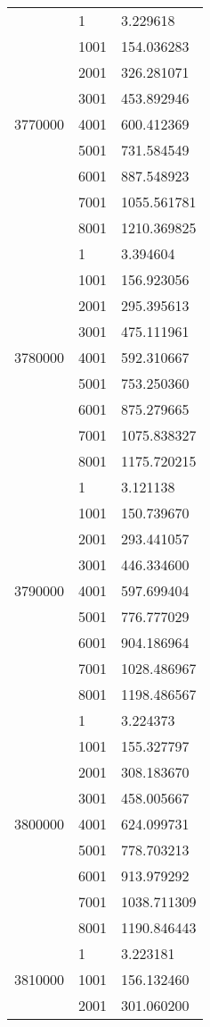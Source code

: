 \begin{table}[htb!]
\begin{tabular}{lll}
\multirow[c]{9}{*}{3770000} & 1 & 3.229618 \\
 & 1001 & 154.036283 \\
 & 2001 & 326.281071 \\
 & 3001 & 453.892946 \\
 & 4001 & 600.412369 \\
 & 5001 & 731.584549 \\
 & 6001 & 887.548923 \\
 & 7001 & 1055.561781 \\
 & 8001 & 1210.369825 \\
\multirow[c]{9}{*}{3780000} & 1 & 3.394604 \\
 & 1001 & 156.923056 \\
 & 2001 & 295.395613 \\
 & 3001 & 475.111961 \\
 & 4001 & 592.310667 \\
 & 5001 & 753.250360 \\
 & 6001 & 875.279665 \\
 & 7001 & 1075.838327 \\
 & 8001 & 1175.720215 \\
\multirow[c]{9}{*}{3790000} & 1 & 3.121138 \\
 & 1001 & 150.739670 \\
 & 2001 & 293.441057 \\
 & 3001 & 446.334600 \\
 & 4001 & 597.699404 \\
 & 5001 & 776.777029 \\
 & 6001 & 904.186964 \\
 & 7001 & 1028.486967 \\
 & 8001 & 1198.486567 \\
\multirow[c]{9}{*}{3800000} & 1 & 3.224373 \\
 & 1001 & 155.327797 \\
 & 2001 & 308.183670 \\
 & 3001 & 458.005667 \\
 & 4001 & 624.099731 \\
 & 5001 & 778.703213 \\
 & 6001 & 913.979292 \\
 & 7001 & 1038.711309 \\
 & 8001 & 1190.846443 \\
\multirow[c]{9}{*}{3810000} & 1 & 3.223181 \\
 & 1001 & 156.132460 \\
 & 2001 & 301.060200 \\

\end{tabular}
\end{table}
